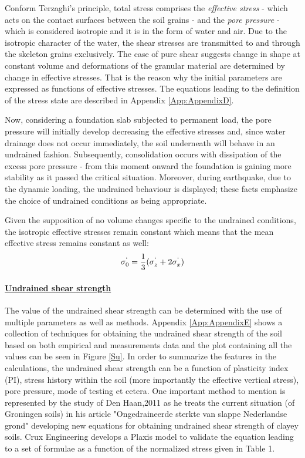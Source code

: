 \documentclass[12pt,a4paper]{report}
\begin{document}
Conform Terzaghi's principle, total stress comprises the \textit{effective stress} - which acts on the contact surfaces between the soil grains - and the \textit{pore pressure} - which is considered isotropic and it is in the form of water and air. Due to the isotropic character of the water, the shear stresses are transmitted to and through the skeleton grains exclusively. The case of pure shear suggests change in shape at constant volume and deformations of the granular material are determined by change in effective stresses. That is the reason why the initial parameters are expressed as functions of effective stresses. The equations leading to the definition of the stress state are described in Appendix \ref{App:AppendixD}.

Now, considering a foundation slab subjected to permanent load, the pore pressure will initially develop decreasing the effective stresses and, since water drainage does not occur immediately, the soil underneath will behave in an undrained fashion. Subsequently, consolidation occurs with dissipation of the excess pore pressure - from this moment onward the foundation is gaining more stability as it passed the critical situation. Moreover, during earthquake, due to the dynamic loading, the undrained behaviour is displayed; these facts emphasize the choice of undrained conditions as being appropriate. 

Given the supposition of no volume changes specific to the undrained conditions, the isotropic effective stresses remain constant which means that the mean effective stress remains constant as well:
\begin{equation}
	\sigma^`_0=\frac{1}{3}(\sigma^`_z+2\sigma^`_x)
\end{equation}

\paragraph{\underline{Undrained shear strength}}
The value of the undrained shear strength can be determined with the use of multiple parameters as well as methods. Appendix \ref{App:AppendixE} shows a collection of techniques for obtaining the undrained shear strength of the soil based on both empirical and measurements data and the plot containing all the values can be seen in Figure \ref{Su}. In order to summarize the features in the calculations, the undrained shear strength can be a function of plasticity index (PI), stress history within the soil (more importantly the effective  vertical stress), pore pressure, mode of testing et cetera.
One important method to mention is represented by the study of Den Haan,2011 \cite{den2011ongedraineerde} as he treats the current situation (of Groningen soils) in his article "Ongedraineerde sterkte van slappe Nederlandse grond" developing new equations for obtaining undrained shear strength of clayey soils. Crux Engineering develops a Plaxis model to validate the equation leading to a set of formulae as a function of the normalized stress given in Table 1.
\end{document}
